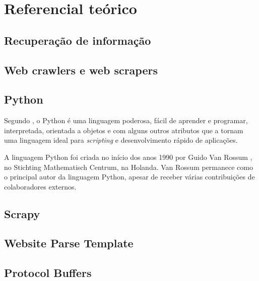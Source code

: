 
\chapter{Referencial teórico}

\section{Recuperação de informação}

\section{Web crawlers e web scrapers}

\section{Python}

Segundo \cite{pythondoc}, o Python é uma linguagem poderosa, fácil de aprender e programar, interpretada, orientada a objetos e com alguns outros atributos que a tornam uma linguagem ideal para \emph{scripting} e desenvolvimento rápido de aplicações.

A linguagem Python foi criada no início dos anos 1990 por Guido Van Rossum \cite{pythonlicense}, no Stichting Mathematisch Centrum, na Holanda. Van Rossum permanece como o principal autor da linguagem Python, apesar de receber várias contribuições de colaboradores externos.


\section{Scrapy}
\section{Website Parse Template}

\section{Protocol Buffers}
